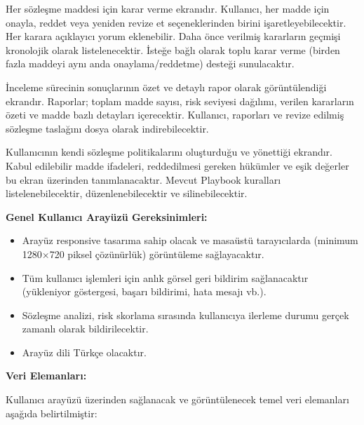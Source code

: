 \documentclass[12pt, a4paper]{article}
\begin{document}
\begin{description}[leftmargin=2cm, style=nextline]
    \item[Onay Akışı Paneli]
    Her sözleşme maddesi için karar verme ekranıdır. Kullanıcı, her madde için onayla, reddet veya yeniden revize et seçeneklerinden birini işaretleyebilecektir. Her karara açıklayıcı yorum eklenebilir. Daha önce verilmiş kararların geçmişi kronolojik olarak listelenecektir. İsteğe bağlı olarak toplu karar verme (birden fazla maddeyi aynı anda onaylama/reddetme) desteği sunulacaktır.

    \item[Rapor ve Dışa Aktarım Ekranı]
    İnceleme sürecinin sonuçlarının özet ve detaylı rapor olarak görüntülendiği ekrandır. Raporlar; toplam madde sayısı, risk seviyesi dağılımı, verilen kararların özeti ve madde bazlı detayları içerecektir. Kullanıcı, raporları ve revize edilmiş sözleşme taslağını dosya olarak indirebilecektir.

    \item[Playbook Yönetim Ekranı]
    Kullanıcının kendi sözleşme politikalarını oluşturduğu ve yönettiği ekrandır. Kabul edilebilir madde ifadeleri, reddedilmesi gereken hükümler ve eşik değerler bu ekran üzerinden tanımlanacaktır. Mevcut Playbook kuralları listelenebilecektir, düzenlenebilecektir ve silinebilecektir.
\end{description}

\textbf{Genel Kullanıcı Arayüzü Gereksinimleri:}
\begin{itemize}[leftmargin=2cm]
    \item Arayüz responsive tasarıma sahip olacak ve masaüstü tarayıcılarda (minimum 1280$\times$720 piksel çözünürlük) görüntüleme sağlayacaktır.
    \item Tüm kullanıcı işlemleri için anlık görsel geri bildirim sağlanacaktır (yükleniyor göstergesi, başarı bildirimi, hata mesajı vb.).
    \item Sözleşme analizi, risk skorlama sırasında kullanıcıya ilerleme durumu gerçek zamanlı olarak bildirilecektir.
    \item Arayüz dili Türkçe olacaktır.
\end{itemize}

\textbf{Veri Elemanları:}

Kullanıcı arayüzü üzerinden sağlanacak ve görüntülenecek temel veri elemanları aşağıda belirtilmiştir:
\end{document}
